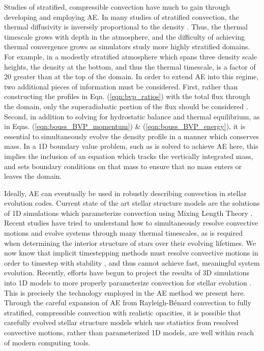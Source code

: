 \documentclass[aps, pre, onecolumn, nofootinbib, notitlepage, groupedaddress, amsfonts, amssymb, amsmath, longbibliography]{revtex4-1}
\newcommand{\RB}{Rayleigh-B\'{e}nard }
\begin{document}
Studies of stratified, compressible convection have much to gain through
developing and employing AE.
In many studies of stratified convection, the thermal diffusivity
is inversely proportional to the density \cite{anders&brown2017}. Thus, the
thermal timescale grows with depth in the atmosphere, and
the difficulty of achieving thermal convergence grows as simulators study more highly
stratified domains. For example, in a modestly stratified atmosphere which spans three
density scale heights, the density at the bottom, and thus the thermal timescale, is a
factor of 20 greater than at the top of the domain.
In order to extend AE into this regime, two additional pieces of information must be considered.
First, rather than constructing the profiles in Eqn. (\ref{eqn:bvp_ratios})
with the total flux through the domain, only the superadiabatic portion of
the flux should be considered \cite{anders&brown2017}.
Second, in addition to solving for
hydrostatic balance and thermal equilibrium, as in Eqns. (\ref{eqn:bouss_BVP_momentum})
\& (\ref{eqn:bouss_BVP_energy}), it is essential to simultaneously evolve the density
profile in a manner which conserves mass.  In a 1D boundary value problem, such as
is solved to achieve AE here, this implies the inclusion of an equation which tracks
the vertically integrated mass, and sets boundary conditions on that mass to ensure
that no mass enters or leaves the domain.

Ideally, AE can eventually be used in robustly describing convection
in stellar evolution codes. Current state of the art stellar structure
models are the solutions of 1D simulations which parameterize convection 
using Mixing Length Theory \cite{paxton&all2011}. Recent studies have tried
to understand how to simultaneously resolve convective motions and evolve
systems through many thermal timescales, as is required when determining the
interior structure of stars over their evolving lifetimes.
We now know that implicit timestepping methods
must resolve convective motions in order to timestep with stability
\cite{viallet&all2011, viallet&all2013, viallet&all2016}, and thus
cannot achieve fast, meaningful system evolution.
Recently, efforts have begun to project the results of 3D simulations into 1D
models to more properly parameterize convection for stellar evolution
\cite{arnett&all2015, cristini&all2016}. This is precisely the technology
employed in the AE method we present here. Through the careful expansion
of AE from \RB convection to fully stratified, compressible convection with realistic
opacities, it is possible that carefully evolved stellar structure models which
use statistics from resolved convective motions, rather than parameterized 1D models,
are well within reach of modern computing tools.
\end{document}
